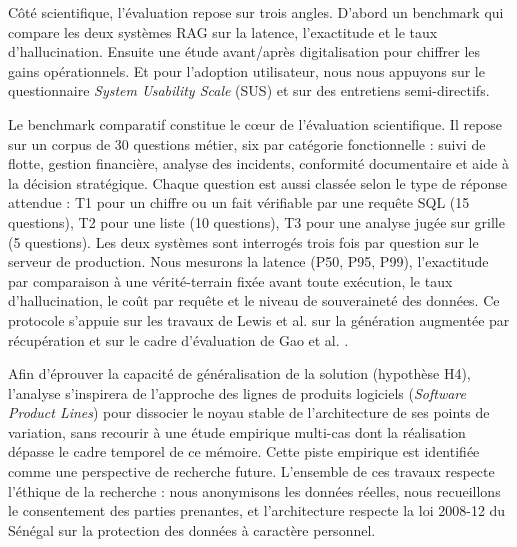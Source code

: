 Côté scientifique, l'évaluation repose sur trois angles. D'abord un benchmark qui compare les deux systèmes RAG sur la latence, l'exactitude et le taux d'hallucination. Ensuite une étude avant/après digitalisation pour chiffrer les gains opérationnels. Et pour l'adoption utilisateur, nous nous appuyons sur le questionnaire \textit{System Usability Scale} (SUS) \cite{brookeSUSAQuickDirty1996} et sur des entretiens semi-directifs.

Le benchmark comparatif constitue le cœur de l'évaluation scientifique. Il repose sur un corpus de 30 questions métier, six par catégorie fonctionnelle : suivi de flotte, gestion financière, analyse des incidents, conformité documentaire et aide à la décision stratégique. Chaque question est aussi classée selon le type de réponse attendue : T1 pour un chiffre ou un fait vérifiable par une requête SQL (15 questions), T2 pour une liste (10 questions), T3 pour une analyse jugée sur grille (5 questions). Les deux systèmes sont interrogés trois fois par question sur le serveur de production. Nous mesurons la latence (P50, P95, P99), l'exactitude par comparaison à une vérité-terrain fixée avant toute exécution, le taux d'hallucination, le coût par requête et le niveau de souveraineté des données. Ce protocole s'appuie sur les travaux de Lewis et al. \cite{lewisRetrievalaugmentedGenerationKnowledgeintensive2020} sur la génération augmentée par récupération et sur le cadre d'évaluation de Gao et al. \cite{gaoRetrievalAugmentedGenerationLarge2024}.

Afin d'éprouver la capacité de généralisation de la solution (hypothèse H4), l'analyse s'inspirera de l'approche des lignes de produits logiciels (\textit{Software Product Lines}) pour dissocier le noyau stable de l'architecture de ses points de variation, sans recourir à une étude empirique multi-cas dont la réalisation dépasse le cadre temporel de ce mémoire. Cette piste empirique est identifiée comme une perspective de recherche future. L'ensemble de ces travaux respecte l'éthique de la recherche : nous anonymisons les données réelles, nous recueillons le consentement des parties prenantes, et l'architecture respecte la loi 2008-12 du Sénégal sur la protection des données à caractère personnel.